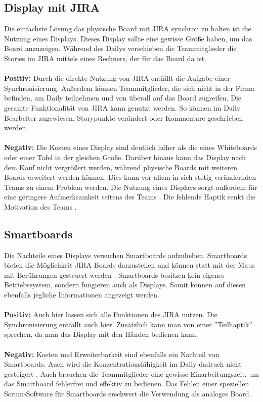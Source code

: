\documentclass[12pt,titlepage]{scrartcl}
\begin{document}
		\subsection{Display mit JIRA}
		Die einfachste Lösung das physische Board mit JIRA synchron zu halten ist die Nutzung eines Displays. Dieses Display sollte eine gewisse Größe haben, um das Board anzuzeigen. Während des Dailys verschieben die Teammitglieder die Stories im JIRA mittels eines Rechners, der für das Board da ist.
		\\ \\
		\textbf{Positiv: }Durch die direkte Nutzung von JIRA entfällt die Aufgabe einer Synchronisierung. Außerdem können Teammitglieder, die sich nicht in der Firma befinden, am Daily teilnehmen und von überall auf das Board zugreifen. Die gesamte Funktionalität von JIRA kann genutzt werden. So können im Daily Bearbeiter zugewiesen, Storypunkte verändert oder Kommentare geschrieben werden.
		\\ \\
		\textbf{Negativ: }Die Kosten eines Display sind deutlich höher als die eines Whiteboards oder einer Tafel in der gleichen Größe. Darüber hinaus kann das Display nach dem Kauf nicht vergrößert werden, während physische Boards mit weiteren Boards erweitert werden können. Dies kann vor allem in sich stetig verändernden Teams zu einem Problem werden. Die Nutzung eines Displays sorgt außerdem für eine geringere Aufmerksamkeit seitens des Teams \cite{pen}. Die fehlende Haptik senkt die Motivation des Teams \cite{progress}. 
		\subsection{Smartboards}
		Die Nachteile eines Displays versuchen Smartboards aufzuheben. Smartboards bieten die Möglichkeit JIRA Boards darzustellen und können statt mit der Maus mit Berührungen gesteuert werden \cite{smart}. Smartboards besitzen kein eigenes Betriebssystem, sondern fungieren auch als Displays. Somit können auf diesen ebenfalls jegliche Informationen angezeigt werden.
		\\ \\
		\textbf{Positiv: }Auch hier lassen sich alle Funktionen des JIRA nutzen. Die Synchronisierung entfällt auch hier. Zusätzlich kann man von einer ''Teilhaptik'' sprechen, da man das Display mit den Händen bedienen kann. 
		\\ \\
		\textbf{Negativ: }Kosten und Erweiterbarkeit sind ebenfalls ein Nachteil von Smartboards. Auch wird die Konzentrationsfähigkeit im Daily dadruch nicht gesteigert \cite{pen}. Auch brauchen die Teammitglieder eine gewisse Einarbeitungszeit, um das Smartboard fehlerfrei und effektiv zu bedienen. Das Fehlen einer speziellen Scrum-Software für Smartboards erschwert die Verwendung als analoges Board.
	\newpage
\end{document}
